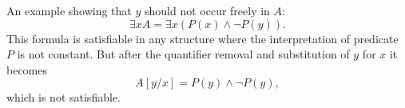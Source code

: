
An example showing that $y$ should not occur freely in $A$:
\[
\exists x A = \exists x (P(x) \wedge \neg P(y)).
\]
This formula is satisfiable in any structure where the interpretation of predicate $P$ is not constant.
But after the quantifier removal and substitution of $y$ for $x$ it becomes
\[
A[y/x] = P(y) \wedge \neg P(y),
\]
which is not satisfiable.






